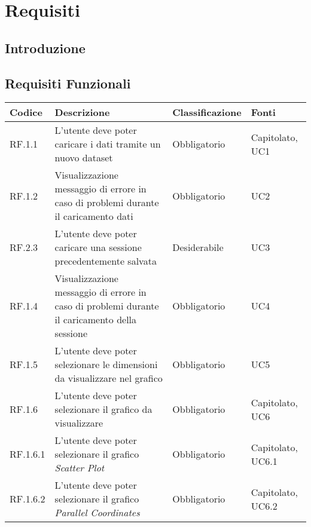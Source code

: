 \chapter{Requisiti}



\section{Introduzione}
\section{Requisiti Funzionali}
\begin{table}[H]
  \centering
  \begin{tabular}{|p{}|p{6cm}|p{3cm}|p{2cm}|}
    \hline
    \rowcolor[HTML]{036400}
    {\color[HTML]{FFFFFF} \textbf{Codice}} & {\color[HTML]{FFFFFF} \textbf{Descrizione}} & {\color[HTML]{FFFFFF} \textbf{Classificazione}} & {\color[HTML]{FFFFFF} \textbf{Fonti}} \\ \hline
    \rowcolor[HTML]{EFEFEF}
    RF.1.1 & L'utente deve poter caricare i dati tramite un nuovo dataset & Obbligatorio & Capitolato, UC1 \\ \hline
    \rowcolor[HTML]{C0C0C0}
    RF.1.2 & Visualizzazione messaggio di errore in caso di problemi durante il caricamento dati & Obbligatorio & UC2 \\ \hline
    \rowcolor[HTML]{EFEFEF}
    RF.2.3 & L'utente deve poter caricare una sessione precedentemente salvata & Desiderabile & UC3 \\ \hline
    \rowcolor[HTML]{C0C0C0}
    RF.1.4 & Visualizzazione messaggio di errore in caso di problemi durante il caricamento della sessione & Obbligatorio & UC4 \\ \hline
    \rowcolor[HTML]{EFEFEF}
    RF.1.5 & L'utente deve poter selezionare le dimensioni da visualizzare nel grafico & Obbligatorio & UC5 \\ \hline
    \rowcolor[HTML]{C0C0C0}
    RF.1.6 & L'utente deve poter selezionare il grafico da visualizzare & Obbligatorio & Capitolato, UC6 \\ \hline
    \rowcolor[HTML]{EFEFEF}
    RF.1.6.1 & L'utente deve poter selezionare il grafico \textit{Scatter Plot} & Obbligatorio & Capitolato, UC6.1 \\ \hline
    \rowcolor[HTML]{C0C0C0}
    RF.1.6.2 & L'utente deve poter selezionare il grafico \textit{Parallel Coordinates} & Obbligatorio & Capitolato, UC6.2 \\ \hline

\end{tabular}
\end{table}
